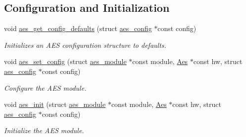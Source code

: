 \subsection*{Configuration and Initialization}
\begin{DoxyCompactItemize}
\item 
void \hyperlink{group__asfdoc__sam0__drivers__aes__group_gad56da9d3959afcfe36876b183e5bf5ff}{aes\+\_\+get\+\_\+config\+\_\+defaults} (struct \hyperlink{structaes__config}{aes\+\_\+config} $\ast$const config)
\begin{DoxyCompactList}\small\item\em Initializes an A\+E\+S configuration structure to defaults. \end{DoxyCompactList}\item 
void \hyperlink{group__asfdoc__sam0__drivers__aes__group_ga803e7c113963451642ecd4f7c476bf9b}{aes\+\_\+set\+\_\+config} (struct \hyperlink{structaes__module}{aes\+\_\+module} $\ast$const module, \hyperlink{struct_aes}{Aes} $\ast$const hw, struct \hyperlink{structaes__config}{aes\+\_\+config} $\ast$const config)
\begin{DoxyCompactList}\small\item\em Configure the A\+E\+S module. \end{DoxyCompactList}\item 
void \hyperlink{group__asfdoc__sam0__drivers__aes__group_gae8460e5d2f7cbf1cce23fd0125f2ed38}{aes\+\_\+init} (struct \hyperlink{structaes__module}{aes\+\_\+module} $\ast$const module, \hyperlink{struct_aes}{Aes} $\ast$const hw, struct \hyperlink{structaes__config}{aes\+\_\+config} $\ast$const config)
\begin{DoxyCompactList}\small\item\em Initialize the A\+E\+S module. \end{DoxyCompactList}\end{DoxyCompactItemize}
